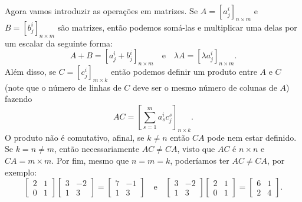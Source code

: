 Agora vamos introduzir as operações em matrizes. Se $A = [a^i_j]_{n \times m}$ e $B = [b^i_j]_{n \times m}$ são matrizes, então podemos somá-las e multiplicar uma delas por um escalar da seguinte forma: \begin{equation}
    A + B = [a^i_j + b^i_j]_{n \times m} \quad \text{e} \quad \lambda A = [\lambda a^i_j]_{n \times m}.
\end{equation} Além disso, se $C = [c^i_j]_{m \times k}$ então podemos definir um produto entre $A$ e $C$ (note que o número de linhas de $C$ deve ser o mesmo número de colunas de $A$) fazendo \begin{equation}
    AC = \left[\sum_{s = 1}^m a^i_s c^s_j\right]_{n \times k}.
\end{equation} O produto não é comutativo, afinal, se $k \neq n$ então $CA$ pode nem estar definido. Se $k = n \neq m$, então necessariamente $AC \neq CA$, visto que $AC$ é $n \times n$ e $CA = m \times m$. Por fim, mesmo que $n = m = k$, poderíamos ter $AC \neq CA$, por exemplo: \begin{equation}
    \begin{bmatrix}
        2 & 1 \\ 0 & 1
    \end{bmatrix} \begin{bmatrix}
        3 & -2 \\ 1 & 3
    \end{bmatrix} = \begin{bmatrix}
        7 & -1 \\ 1 & 3
    \end{bmatrix} \quad \text{e} \quad \begin{bmatrix}
        3 & -2 \\ 1 & 3
    \end{bmatrix} \begin{bmatrix}
        2 & 1 \\ 0 & 1
    \end{bmatrix} = \begin{bmatrix}
        6 & 1 \\ 2 & 4
    \end{bmatrix}.
\end{equation}

